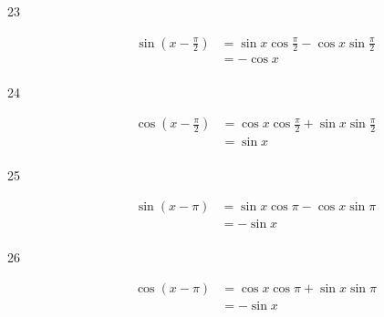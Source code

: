 \documentclass{exam}
\begin{document}
\begin{description}

      \item[23] 
        \begin{align*}
          \sin \left( x - \frac{\pi}{2} \right) & = \sin x \cos \frac{\pi}{2} - \cos x \sin \frac{\pi}{2} \\
                                                & = - \cos x \\
        \end{align*}

      \item[24] 
        \begin{align*}
          \cos \left( x - \frac{\pi}{2} \right) & = \cos x \cos \frac{\pi}{2} + \sin x \sin \frac{\pi}{2} \\
                                                & = \sin x \\
        \end{align*}

      \item[25] 
        \begin{align*}
          \sin(x - \pi) & = \sin x \cos \pi - \cos x \sin \pi \\
                        & = - \sin x \\
        \end{align*}

      \item[26] 
        \begin{align*}
          \cos(x - \pi) & = \cos x \cos \pi + \sin x \sin \pi \\
                        & = - \sin x \\
        \end{align*}


\end{description}
\end{document}
